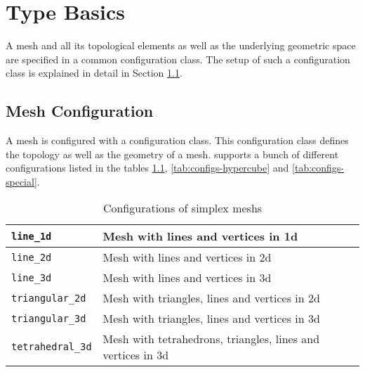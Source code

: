 \chapter{Type Basics} \label{chap:typebasics}

A mesh and all its topological elements as well as the underlying geometric space are specified in a common configuration class.
The setup of such a configuration class is explained in detail in Section \ref{sec:mesh-configuration}.

\section{Mesh Configuration} \label{sec:mesh-configuration}

A mesh is configured with a configuration class. This configuration class defines the topology as well as the geometry of a mesh. {\ViennaGrid} supports a bunch of different configurations listed in the tables \ref{tab:configs-simplex}, \ref{tab:configs-hypercube} and \ref{tab:configs-special}.


\begin{table}[tb]
  \begin{center}
    \begin{tabular}{|l|l|}
      \hline
      \lstinline|line_1d|   &  Mesh with lines and vertices in 1d  \\
      \hline
      \lstinline|line_2d|   &  Mesh with lines and vertices in 2d  \\
      \hline
      \lstinline|line_3d|   &  Mesh with lines and vertices in 3d  \\
      \hline 
      \lstinline|triangular_2d| &   Mesh with triangles, lines and vertices in 2d  \\
      \hline
      \lstinline|triangular_3d| &   Mesh with triangles, lines and vertices in 3d  \\
      \hline
      \lstinline|tetrahedral_3d| &   Mesh with tetrahedrons, triangles, lines and vertices in 3d  \\
      \hline
    \end{tabular}
    \caption{Configurations of simplex meshs}
    \label{tab:configs-simplex}
  \end{center}
\end{table}


